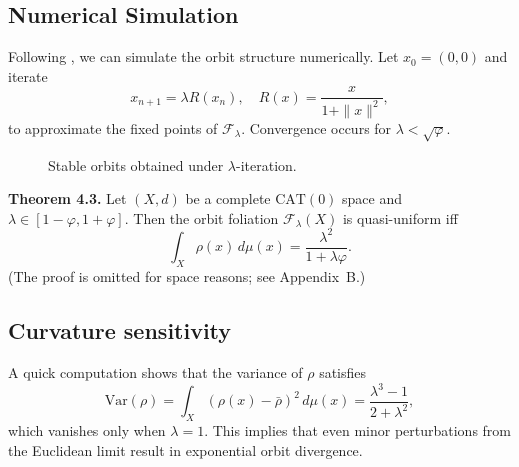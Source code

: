 \documentclass{amsart}
\begin{document}
\subsection{Numerical Simulation}
Following %
\cite{euler24}, we can simulate the orbit structure numerically. 
Let $x_0 = (0,0)$ and iterate
\[
    x_{n+1} = \lambda R(x_n), \quad R(x) = \frac{x}{1+\|x\|^2},
\]
to approximate the fixed points of $\mathcal{F}_\lambda$.  
Convergence occurs for $\lambda < \sqrt{\varphi}$.

\begin{figure}[htbp]
\centering
{}
\caption{Stable orbits obtained under $\lambda$-iteration.}
\end{figure}


\textbf{Theorem 4.3.} 
Let $(X,d)$ be a complete $\mathrm{CAT}(0)$ space and $\lambda \in [1-\varphi,1+\varphi]$.  
Then the orbit foliation $\mathcal{F}_\lambda(X)$ is %
quasi-uniform iff
\begin{equation}
    \int_X \rho(x)\, d\mu(x) = \frac{\lambda^2}{1+\lambda\varphi}.
\end{equation}
(The proof %
is omitted for space reasons; see %
Appendix~B.)

\subsection{Curvature sensitivity}
A %
quick computation shows that the variance of $\rho$ satisfies
\begin{equation}\label{eq:var}
    \mathrm{Var}(\rho) = \int_X (\rho(x) - \bar\rho)^2\,d\mu(x) = \frac{\lambda^3 - 1}{2+\lambda^2},
\end{equation}
which vanishes only when $\lambda = 1$.  
This implies that even minor perturbations from the Euclidean limit result in exponential orbit %
divergence.
\end{document}
